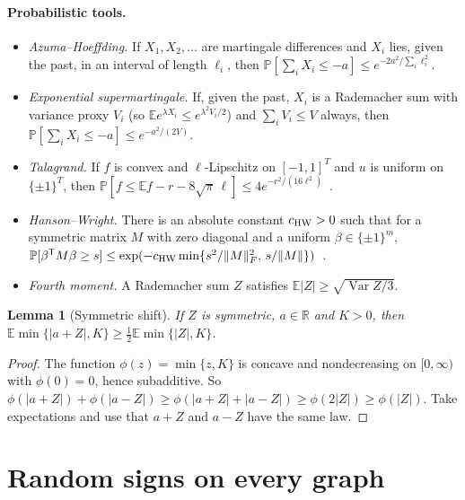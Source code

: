 \documentclass[11pt,a4paper]{article}
\newtheorem{lemma}[theorem]{Lemma}
\theoremstyle{definition}
\theoremstyle{remark}
\newcommand{\E}{\mathbb E}
\newcommand{\Prb}{\mathbb P}
\begin{document}
\paragraph{Probabilistic tools.}
\begin{itemize}
\item[(T1)] \emph{Azuma--Hoeffding.} If $X_1,X_2,\dots$ are martingale
differences and $X_i$ lies, given the past, in an interval of length $\ell_i$,
then $\Prb[\sum_iX_i\le-a]\le e^{-2a^2/\sum_i\ell_i^2}$.
\item[(T2)] \emph{Exponential supermartingale.} If, given the past, $X_i$ is a
Rademacher sum with variance proxy $V_i$ (so $\E e^{\lambda X_i}\le
e^{\lambda^2V_i/2}$) and $\sum_iV_i\le V$ always, then
$\Prb[\sum_iX_i\le-a]\le e^{-a^2/(2V)}$.
\item[(T3)] \emph{Talagrand.} If $f$ is convex and $\ell$-Lipschitz on
$[-1,1]^T$ and $u$ is uniform on $\{\pm1\}^T$, then
$\Prb[f\le\E f-r-8\sqrt\pi\,\ell]\le4e^{-r^2/(16\ell^2)}$~\cite{Tal95}.
\item[(T4)] \emph{Hanson--Wright.} There is an absolute constant $c_{\rm HW}>0$
such that for a symmetric matrix $M$ with zero diagonal and a uniform
$\beta\in\{\pm1\}^m$,
$\Prb[\beta^{\mathsf T}M\beta\ge s]\le\exp(-c_{\rm HW}\min\{s^2/\|M\|_F^2,\,
s/\|M\|\})$~\cite{RV13}.
\item[(T5)] \emph{Fourth moment.} A Rademacher sum $Z$ satisfies
$\E|Z|\ge\sqrt{\operatorname{Var}Z/3}$.
\end{itemize}

\begin{lemma}[Symmetric shift]\label{lem:shift}
If $Z$ is symmetric, $a\in\mathbb R$ and $K>0$, then
$\E\min\{|a+Z|,K\}\ge\frac12\E\min\{|Z|,K\}$.
\end{lemma}
\begin{proof}
The function $\phi(z)=\min\{z,K\}$ is concave and nondecreasing on $[0,\infty)$
with $\phi(0)=0$, hence subadditive. So $\phi(|a+Z|)+\phi(|a-Z|)\ge
\phi(|a+Z|+|a-Z|)\ge\phi(2|Z|)\ge\phi(|Z|)$. Take expectations and use that
$a+Z$ and $a-Z$ have the same law.
\end{proof}

\section{Random signs on every graph}\label{sec:weighted}
\end{document}

